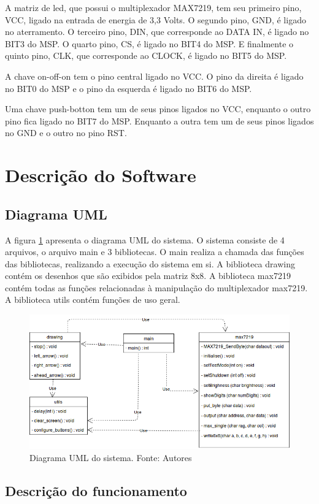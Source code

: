 \documentclass[conference]{IEEEtran}
\begin{document}
A matriz de led, que possui o multiplexador MAX7219, tem seu primeiro pino, VCC, ligado na entrada de energia de 3,3 Volts. O segundo pino, GND, é ligado no aterramento. O terceiro pino, DIN, que corresponde ao DATA IN, é ligado no BIT3 do MSP. O quarto pino, CS, é ligado no BIT4 do MSP. E finalmente o quinto pino, CLK, que corresponde ao CLOCK, é ligado no BIT5 do MSP. 

A chave on-off-on tem o pino central ligado no VCC. O pino da direita é ligado no BIT0 do MSP e o pino da esquerda é ligado no BIT6 do MSP. 

Uma chave push-botton tem um de seus pinos ligados no VCC, enquanto o outro pino fica ligado no BIT7 do MSP. 
Enquanto a outra tem um de seus pinos ligados no GND e o outro no pino RST.

\section{Descrição do Software}
\subsection{Diagrama UML}
A figura \ref{fig:uml} apresenta o diagrama UML do sistema. O sistema consiste de 4 arquivos, o arquivo main e 3 bibliotecas. O main realiza a chamada das funções das bibliotecas, realizando a execução do sistema em si. A biblioteca drawing contém os desenhos que são exibidos pela matriz 8x8. A biblioteca max7219 contém todas as funções relacionadas à manipulação do multiplexador max7219. A biblioteca utils contém funções de uso geral. 

\begin{figure}[H]
  \centering
  \includegraphics[width=0.9\linewidth]{uml}
  \caption{Diagrama UML do sistema. Fonte: Autores}
  \label{fig:uml}
\end{figure}

\subsection{Descrição do funcionamento}
\end{document}
